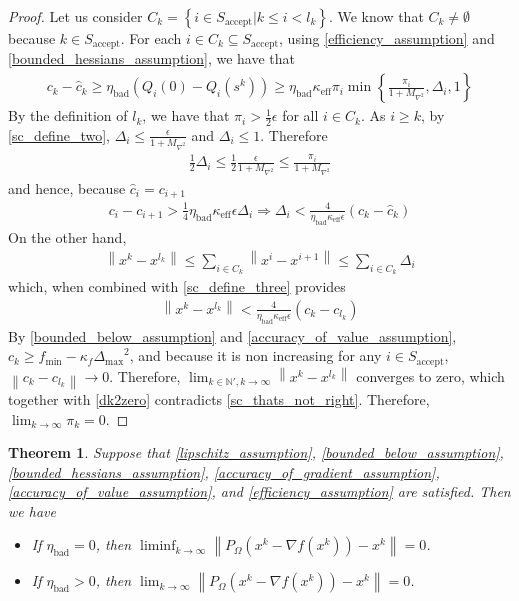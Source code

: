 \documentclass{article}
\newtheorem{theorem}{Theorem}[section]
\theoremstyle{case}
\newcommand{\naturals}{{\mathbb N}}
\newcommand{\xk}{{x^k}}
\newcommand{\ck}{{c_k}}
\newcommand{\domain}{{\Omega}}
\newcommand{\pik}{{\pi_k}}
\newcommand{\sk}{{s^k}}
\newcommand{\fmin}{{f_{\text{min}}}}
\newcommand{\ctrialk}{{\hat c_k}}
\newcommand{\kappaf}{{\kappa_{f}}}
\newcommand{\gradfk}{{\nabla f \left(\xk\right)}}
\newcommand{\maxhes}{{M_{\nabla^2}}}
\newcommand{\ebad}{{\eta_{\text{bad}}}}
\newcommand{\accepting}{{S_{\text{accept}}}}
\newcommand{\keff}{{\kappa_{\text{eff}}}}
\newcommand{\dmax}{{\Delta_{\text{max}}}}
\begin{document}
\begin{proof}
Let us consider $C_k = \left\{i \in \accepting | k \le i < l_k\right\}$.
We know that $C_k \ne \emptyset$ because $k \in \accepting$.
For each $i \in C_k \subseteq \accepting$, using \cref{efficiency_assumption} and \cref{bounded_hessians_assumption}, we have that
\begin{align*}
\ck - \ctrialk \ge \ebad\left(Q_i\left(0\right) - Q_i\left(\sk\right)\right) \ge \ebad \keff \pi_i \min\left\{\frac {\pi_i}{1 + \maxhes}, \Delta_i, 1\right\}
\end{align*}
By the definition of $l_k$, we have that $\pi_i > \frac 1 2 \epsilon$ for all $i \in C_k$.
As $i \ge k$, by \cref{sc_define_two}, $\Delta_i \le \frac {\epsilon}{1 + \maxhes}$ and $\Delta_i \le 1$.
Therefore
\begin{align*}
\frac 1 2 \Delta_i \le \frac 1 2 \frac {\epsilon}{1 + \maxhes} \le \frac {\pi_i}{1 + \maxhes}
\end{align*}
and hence, because $\hat c_i = c_{i+1}$
\begin{align}
c_i - c_{i+1} > \frac 1 4 \ebad \keff \epsilon \Delta_i \Longrightarrow \Delta_i < \frac 4 {\ebad \keff \epsilon} \left(\ck - \ctrialk\right) \label{sc_define_three}
\end{align}
On the other hand,
\begin{align*}
\left\|\xk - x^{l_k}\right\| \le \sum_{i \in C_k} \left\|x^i - x^{i+1}\right\| \le \sum_{i \in C_k} \Delta_i
\end{align*}
which, when combined with \cref{sc_define_three} provides
\begin{align*}
\left\|\xk - x^{l_k}\right\| < \frac 4 {\ebad \keff \epsilon} \left(\ck - c_{l_k} \right) 
\end{align*}
By \cref{bounded_below_assumption} and \cref{accuracy_of_value_assumption}, $\ck \ge \fmin - \kappaf\dmax^2$, and because it is non increasing for any $i \in \accepting$,
$\left\|\ck - c_{l_k}\right\| \to 0$.
Therefore, $\lim_{k \in \naturals', k \to \infty} \left\|\xk - x^{l_k}\right\|$ converges to zero, which together with \cref{dk2zero} contradicts \cref{sc_thats_not_right}.
Therefore, $\lim_{k \to \infty} \pik = 0$.
\end{proof}







\begin{theorem}
\label{convergence_theorem}
Suppose that 
\cref{lipschitz_assumption},
\cref{bounded_below_assumption},
\cref{bounded_hessians_assumption},
\cref{accuracy_of_gradient_assumption},
\cref{accuracy_of_value_assumption},
and \cref{efficiency_assumption}
are satisfied.
Then we have
\begin{itemize}
\item If $\ebad = 0$, then $\liminf_{k\to\infty} \left\|P_{\domain}\left(\xk - \gradfk\right) - \xk\right\| = 0$.
\item If $\ebad > 0$, then $\lim_{k\to\infty} \left\|P_{\domain}\left(\xk - \gradfk\right) - \xk\right\| = 0$.
\end{itemize}
\end{theorem}
\end{document}

